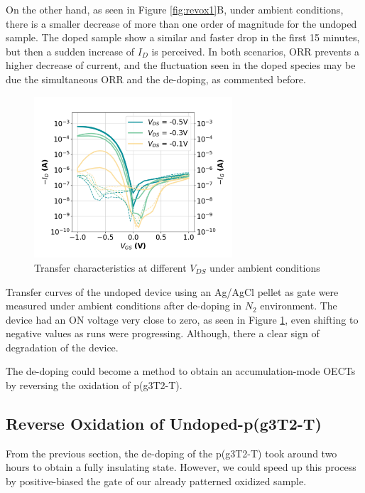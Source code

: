 On the other hand, as seen in Figure \ref{fig:revox1}B, under ambient conditions, there is a smaller decrease of more than one order of magnitude for the undoped sample. The doped sample show a similar and faster drop in the first 15 minutes, but then a sudden increase of $I_{D}$ is perceived. In both scenarios, ORR prevents a higher decrease of current, and the fluctuation seen in the doped species may be due the simultaneous ORR and the de-doping, as commented before. %

\begin{figure}[ht]
    \centering
    \includegraphics[height=6cm]{Images/pdf/revox_transfer_loop2.pdf}%
    \caption[Transfer characteristics after dedoping]{Transfer characteristics at different $V_{DS}$ under ambient conditions}
    \label{fig:transrevox1}
\end{figure}

Transfer curves of the undoped device using an Ag/AgCl pellet as gate were measured under ambient conditions after de-doping in $N_{2}$ environment. The device had an ON voltage very close to zero, as seen in Figure \ref{fig:transrevox1}, even shifting to negative values as runs were progressing. Although, there a clear sign of degradation of the device. 

The de-doping could become a method to obtain an accumulation-mode OECTs by reversing the oxidation of p(g3T2-T).

\subsection{Reverse Oxidation of Undoped-p(g3T2-T)}
From the previous section, the de-doping of the p(g3T2-T) took around two hours to obtain a fully insulating state. However, we could speed up this process by positive-biased the gate of our already patterned oxidized sample. 


